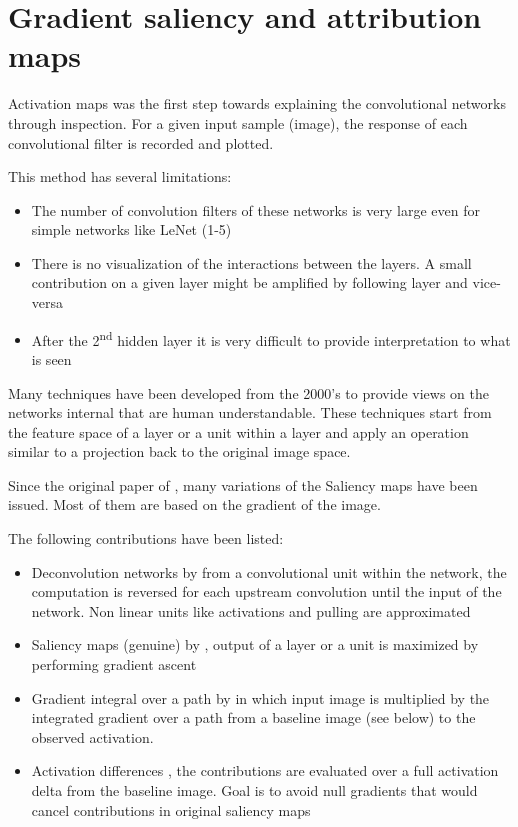 \section{Gradient saliency and attribution maps}
\label{sec2}

Activation maps was the first step towards explaining the convolutional networks through inspection. For a given input sample (image), the response of each convolutional filter is recorded and plotted.

This method has several limitations:
\begin{itemize}
    \item The number of convolution filters of these networks is very large even for simple networks like LeNet (1-5)
    \item There is no visualization of the interactions between the layers. A small contribution on a given layer might be amplified by following layer and vice-versa
    \item After the 2\textsuperscript{nd} hidden layer it is very difficult to provide interpretation to what is seen
\end{itemize}

Many techniques have been developed from the 2000's to provide views on the networks internal that are human understandable. These techniques start from the feature space of a layer or a unit within a layer and apply an operation similar to a projection back to the original image space.

Since the original paper of \cite{Erhan2009}, many variations of the Saliency maps have been issued. Most of them are based on the gradient of the image.

The following contributions have been listed:
\begin{itemize}
    \item Deconvolution networks by \cite{Zeiler2013} from a convolutional unit within the network, the computation is reversed for each upstream convolution until the input of the network. Non linear units like activations and pulling are approximated
    \item Saliency maps (genuine) by \cite{Simonyan2014}, output of a layer or a unit is maximized by performing gradient ascent
    \item Gradient integral over a path by \cite{Sundararajan2017} in which input image is multiplied by the integrated gradient over a path from a baseline image (see below) to the observed activation. 
    \item Activation differences \cite{Shrikumar2017}, the contributions are evaluated over a full activation delta from the baseline image. Goal is to avoid null gradients that would cancel contributions in original saliency maps
\end{itemize}

